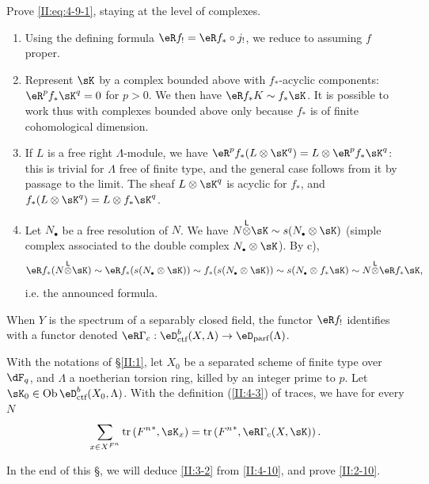 Prove \eqref{II:eq:4-9-1}, staying at the level of complexes.
\begin{enumerate}[\indent a)]
  \item Using the defining formula $\eR f_! = \eR f_*\circ j_!$, we reduce
    to assuming $f$ proper.
  \item Represent $\sK$ by a complex bounded
    above with $f_*$-acyclic components: $\eR^p f_* \sK^q = 0$
    for $p>0$. We then have $\eR f_* K \sim f_* \sK$. It is possible to
    work thus with complexes bounded above only because
    $f_*$ is of finite cohomological dimension.
  \item If $L$ is a free right $\Lambda$-module, we have
    $\eR^p f_*(L\otimes \sK^q) = L\otimes \eR^p f_* \sK^q$: this is trivial for
    $\Lambda$ free of finite type, and the general case follows from it by
    passage to the limit. The sheaf $L\otimes \sK^q$ is acyclic for
    $f_*$, and $f_*(L\otimes \sK^q) = L\otimes f_* \sK^q$.
  \item Let $N_\bullet$ be a free resolution of $N$. We have
    $N\lotimes \sK\sim s(N_\bullet\otimes \sK)$ (simple complex associated to the
    double complex $N_\bullet\otimes \sK$). By c),
    \[
      \eR f_*(N\lotimes \sK) \sim \eR f_* (s(N_\bullet\otimes \sK)) \sim f_*(s(N_\bullet\otimes \sK)) \sim s(N_\bullet\otimes f_* \sK) \sim N\lotimes \eR f_* \sK \text{,}
    \]
    i.e. the announced formula.
\end{enumerate}

When $Y$ is the spectrum of a separably closed field, the functor $\eR f_!$
identifies with a functor denoted
$\eR \Gamma_c : \eD_\text{ctf}^b(X,\Lambda)\to\eD_\text{parf}(\Lambda)$.




\begin{theorem_}\label{II:4-10}
With the notations of \S\ref{II:1}, let $X_0$ be a separated scheme of
finite type over $\dF_q$, and $\Lambda$ a noetherian torsion ring, killed by an
integer prime to $p$. Let $\sK_0\in\ob\eD_\textnormal{ctf}^b(X_0,\Lambda)$.
With the definition (\ref{II:4-3}) of traces, we have for every $N$
\begin{equation*}\label{II:eq:4-10}
  \sum_{x\in X^{F^n}} \tr\left({F^n}^*,\sK_x\right) = \tr\left({F^n}^*,\eR\Gamma_c(X,\sK)\right) \text{.}
\end{equation*}
\end{theorem_}

In the end of this \S, we will deduce \ref{II:3-2} from \ref{II:4-10}, and
prove \ref{II:2-10}.




